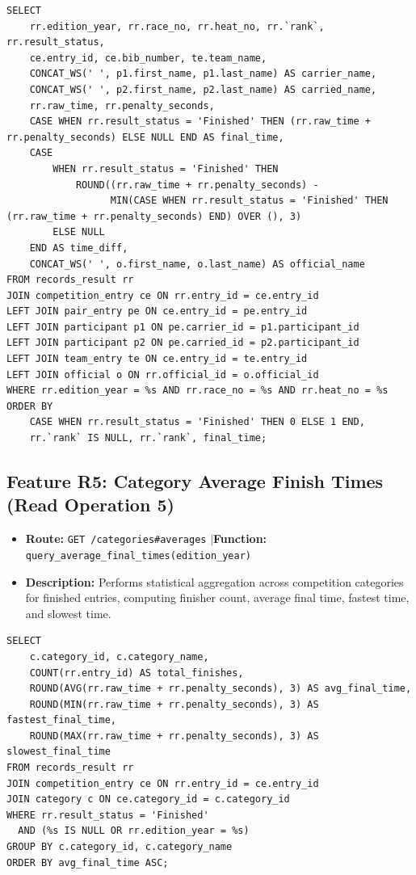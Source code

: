 \documentclass[11pt,a4paper]{article}
\begin{document}
\begin{lstlisting}
SELECT 
    rr.edition_year, rr.race_no, rr.heat_no, rr.`rank`, rr.result_status,
    ce.entry_id, ce.bib_number, te.team_name,
    CONCAT_WS(' ', p1.first_name, p1.last_name) AS carrier_name,
    CONCAT_WS(' ', p2.first_name, p2.last_name) AS carried_name,
    rr.raw_time, rr.penalty_seconds,
    CASE WHEN rr.result_status = 'Finished' THEN (rr.raw_time + rr.penalty_seconds) ELSE NULL END AS final_time,
    CASE 
        WHEN rr.result_status = 'Finished' THEN 
            ROUND((rr.raw_time + rr.penalty_seconds) - 
                  MIN(CASE WHEN rr.result_status = 'Finished' THEN (rr.raw_time + rr.penalty_seconds) END) OVER (), 3)
        ELSE NULL 
    END AS time_diff,
    CONCAT_WS(' ', o.first_name, o.last_name) AS official_name
FROM records_result rr
JOIN competition_entry ce ON rr.entry_id = ce.entry_id
LEFT JOIN pair_entry pe ON ce.entry_id = pe.entry_id
LEFT JOIN participant p1 ON pe.carrier_id = p1.participant_id
LEFT JOIN participant p2 ON pe.carried_id = p2.participant_id
LEFT JOIN team_entry te ON ce.entry_id = te.entry_id
LEFT JOIN official o ON rr.official_id = o.official_id
WHERE rr.edition_year = %s AND rr.race_no = %s AND rr.heat_no = %s
ORDER BY 
    CASE WHEN rr.result_status = 'Finished' THEN 0 ELSE 1 END,
    rr.`rank` IS NULL, rr.`rank`, final_time;
\end{lstlisting}

\subsection{Feature R5: Category Average Finish Times (Read Operation 5)}
\begin{itemize}[leftmargin=1.5em, itemsep=0.5pt, topsep=0.5pt]
  \item \textbf{Route:} \texttt{GET /categories\#averages} \quad$\vert$\quad \textbf{Function:} \texttt{query\_average\_final\_times(edition\_year)}
  \item \textbf{Description:} Performs statistical aggregation across competition categories for finished entries, computing finisher count, average final time, fastest time, and slowest time.
\end{itemize}

\begin{lstlisting}
SELECT 
    c.category_id, c.category_name,
    COUNT(rr.entry_id) AS total_finishes,
    ROUND(AVG(rr.raw_time + rr.penalty_seconds), 3) AS avg_final_time,
    ROUND(MIN(rr.raw_time + rr.penalty_seconds), 3) AS fastest_final_time,
    ROUND(MAX(rr.raw_time + rr.penalty_seconds), 3) AS slowest_final_time
FROM records_result rr
JOIN competition_entry ce ON rr.entry_id = ce.entry_id
JOIN category c ON ce.category_id = c.category_id
WHERE rr.result_status = 'Finished'
  AND (%s IS NULL OR rr.edition_year = %s)
GROUP BY c.category_id, c.category_name
ORDER BY avg_final_time ASC;
\end{lstlisting}
\end{document}
